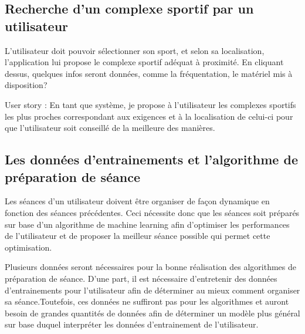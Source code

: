 \subsection*{Recherche d'un complexe sportif par un utilisateur}

L'utilisateur doit pouvoir sélectionner son sport, et selon sa localisation, l'application lui propose le complexe sportif adéquat à proximité. En cliquant dessus, quelques infos seront données, comme la fréquentation, le matériel mis à disposition?\\

\begin{itshape}
User story : En tant que système, je propose à l'utilisateur les complexes sportifs les plus proches correspondant aux exigences et à la localisation de celui-ci pour que l'utilisateur soit conseillé de la meilleure des manières.

\end{itshape}


\subsection*{Les données d'entrainements et l'algorithme de préparation de séance}

Les séances d'un utilisateur doivent être organiser de façon dynamique en fonction des séances précédentes. Ceci nécessite donc que les séances soit préparés sur base d'un algorithme de machine learning afin d'optimiser les performances de l'utilisateur et de proposer la meilleur séance possible qui permet cette optimisation.

Plusieurs données seront nécessaires pour la bonne réalisation des algorithmes de préparation de séance. D'une part, il est nécessaire d'entretenir des données d'entrainements pour l'utilisateur afin de déterminer au mieux comment organiser sa séance.Toutefois, ces données ne suffiront pas pour les algorithmes et auront besoin de grandes quantités de données afin de déterminer un modèle plus général sur base duquel interpréter les données d'entrainement de l'utilisateur.  